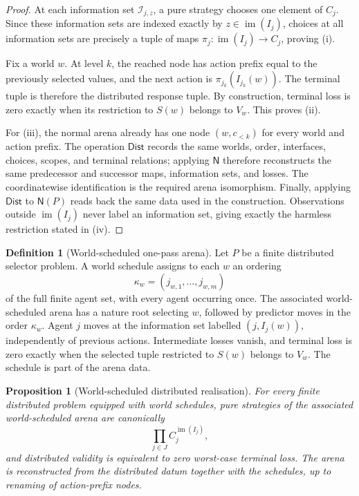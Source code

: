 \documentclass[11pt]{article}
\theoremstyle{plain}
\newtheorem{proposition}[theorem]{Proposition}
\theoremstyle{definition}
\newtheorem{definition}[theorem]{Definition}
\theoremstyle{remark}
\newcommand{\im}{\operatorname{im}}
\begin{document}
\begin{proof}
At each information set $\mathcal I_{j,z}$, a pure strategy chooses one element
of $C_j$. Since these information sets are indexed exactly by
$z\in\im(I_j)$, choices at all information sets are precisely a tuple of maps
$\pi_j:\im(I_j)\to C_j$, proving (i).

Fix a world $w$. At level $k$, the reached node has action prefix equal to the
previously selected values, and the next action is
$\pi_{j_k}(I_{j_k}(w))$. The terminal tuple is therefore the distributed
response tuple. By construction, terminal loss is zero exactly when its
restriction to $S(w)$ belongs to $V_w$. This proves (ii).

For (iii), the normal arena already has one node $(w,c_{<k})$ for every world
and action prefix. The operation $\mathsf{Dist}$ records the same worlds, order,
interfaces, choices, scopes, and terminal relations; applying $\mathsf N$
therefore reconstructs the same predecessor and successor maps, information
sets, and losses. The coordinatewise identification is the required arena
isomorphism. Finally, applying $\mathsf{Dist}$ to $\mathsf N(P)$ reads back the
same data used in the construction. Observations outside $\im(I_j)$ never label
an information set, giving exactly the harmless restriction stated in (iv).
\end{proof}


\begin{definition}[World-scheduled one-pass arena]
\label{def:world-scheduled}
Let $P$ be a finite distributed selector problem. A world schedule assigns to
each $w$ an ordering
\[
\kappa_w=(j_{w,1},\ldots,j_{w,m})
\]
of the full finite agent set, with every agent occurring once. The associated
world-scheduled arena has a nature root selecting $w$, followed by predictor
moves in the order $\kappa_w$. Agent $j$ moves at the information set labelled
$(j,I_j(w))$, independently of previous actions. Intermediate losses vanish,
and terminal loss is zero exactly when the selected tuple restricted to $S(w)$
belongs to $V_w$. The schedule is part of the arena data.
\end{definition}

\begin{proposition}[World-scheduled distributed realisation]
\label{prop:world-scheduled}
For every finite distributed problem equipped with world schedules, pure
strategies of the associated world-scheduled arena are canonically
\[
\prod_{j\in J}C_j^{\im(I_j)},
\]
and distributed validity is equivalent to zero worst-case terminal loss. The
arena is reconstructed from the distributed datum together with the schedules,
up to renaming of action-prefix nodes.
\end{proposition}
\end{document}
